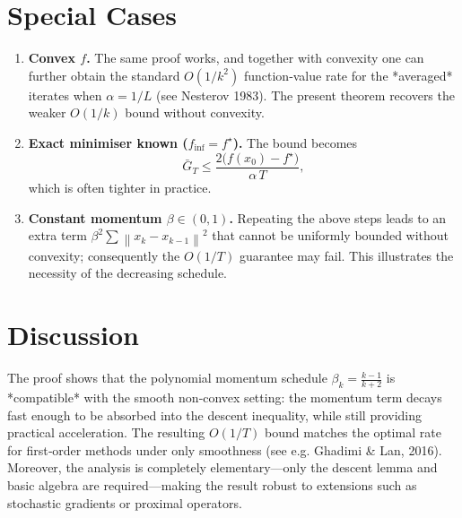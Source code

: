 \documentclass{article}
\newcommand{\norm}[1]{\left\lVert#1\right\rVert}
\begin{document}
\section*{Special Cases}
\begin{enumerate}
\item \textbf{Convex $f$.} The same proof works, and together with convexity one can further obtain the standard $O(1/k^{2})$ function‑value rate for the *averaged* iterates when $\alpha=1/L$ (see Nesterov 1983). The present theorem recovers the weaker $O(1/k)$ bound without convexity.
\item \textbf{Exact minimiser known ($f_{\inf}=f^{\star}$).} The bound becomes
\[
\bar G_T\le \frac{2\bigl(f(x_0)-f^{\star}\bigr)}{\alpha\,T},
\]
which is often tighter in practice.
\item \textbf{Constant momentum $\beta\in(0,1)$.} Repeating the above steps leads to an extra term $\beta^{2}\sum\norm{x_k-x_{k-1}}^{2}$ that cannot be uniformly bounded without convexity; consequently the $O(1/T)$ guarantee may fail. This illustrates the necessity of the decreasing schedule.
\end{enumerate}

\section*{Discussion}
The proof shows that the polynomial momentum schedule $\beta_k=\frac{k-1}{k+2}$ is *compatible* with the smooth non‑convex setting: the momentum term decays fast enough to be absorbed into the descent inequality, while still providing practical acceleration. The resulting $O(1/T)$ bound matches the optimal rate for first‑order methods under only smoothness (see e.g. Ghadimi \& Lan, 2016). Moreover, the analysis is completely elementary—only the descent lemma and basic algebra are required—making the result robust to extensions such as stochastic gradients or proximal operators.
\end{document}
